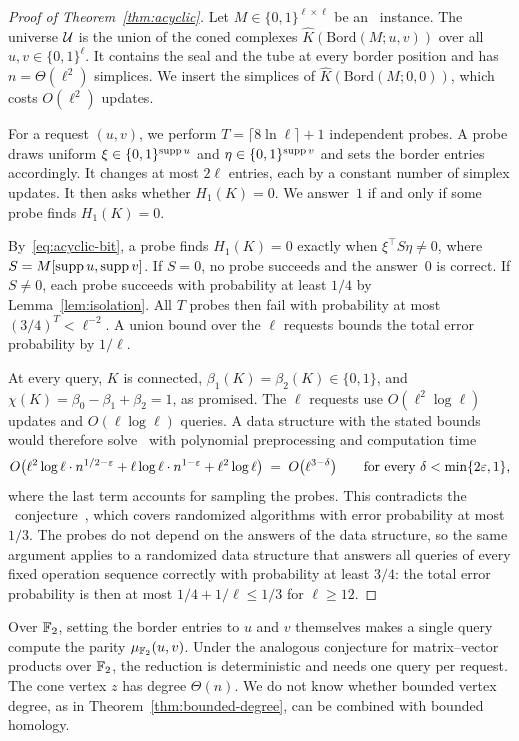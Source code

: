 \begin{proof}[Proof of Theorem~\ref{thm:acyclic}]
Let $M\in\{0,1\}^{\ell\times\ell}$ be an \OuMv\ instance.
The universe $\mathcal{U}$ is the union of the coned complexes $\widehat K(\mathrm{Bord}(M;u,v))$ over all $u,v\in\{0,1\}^{\ell}$.
It contains the seal and the tube at every border position and has $n=\Theta(\ell^2)$ simplices.
We insert the simplices of $\widehat K(\mathrm{Bord}(M;0,0))$, which costs $O(\ell^2)$ updates.

For a request $(u,v)$, we perform $T=\lceil 8\ln\ell\rceil+1$ independent probes.
A probe draws uniform $\xi\in\{0,1\}^{\operatorname{supp} u}$ and $\eta\in\{0,1\}^{\operatorname{supp} v}$ and sets the border entries accordingly.
It changes at most $2\ell$ entries, each by a constant number of simplex updates.
It then asks whether $H_1(K)=0$.
We answer~$1$ if and only if some probe finds $H_1(K)=0$.

By~\eqref{eq:acyclic-bit}, a probe finds $H_1(K)=0$ exactly when $\xi^{\top}S\eta\ne0$, where $S=M[\operatorname{supp} u,\operatorname{supp} v]$.
If $S=0$, no probe succeeds and the answer~$0$ is correct.
If $S\ne0$, each probe succeeds with probability at least $1/4$ by Lemma~\ref{lem:isolation}.
All $T$ probes then fail with probability at most $(3/4)^T<\ell^{-2}$.
A union bound over the $\ell$ requests bounds the total error probability by $1/\ell$.

At every query, $K$ is connected, $\beta_1(K)=\beta_2(K)\in\{0,1\}$, and $\chi(K)=\beta_0-\beta_1+\beta_2=1$, as promised.
The $\ell$ requests use $O(\ell^2\log\ell)$ updates and $O(\ell\log\ell)$ queries.
A data structure with the stated bounds would therefore solve \OuMv\ with polynomial preprocessing and computation time
\[
  O\bigl(\ell^2\log\ell\cdot n^{1/2-\varepsilon}+\ell\log\ell\cdot n^{1-\varepsilon}+\ell^2\log\ell\bigr)
  \;=\;O\bigl(\ell^{3-\delta}\bigr)\qquad\text{for every }\delta<\min\{2\varepsilon,1\},
\]
where the last term accounts for sampling the probes.
This contradicts the \OMv\ conjecture~\cite{HKNS15}, which covers randomized algorithms with error probability at most $1/3$.
The probes do not depend on the answers of the data structure, so the same argument applies to a randomized data structure that answers all queries of every fixed operation sequence correctly with probability at least $3/4$: the total error probability is then at most $1/4+1/\ell\le1/3$ for $\ell\ge12$.
\end{proof}

\begin{remark}
Over $\mathbb{F}_2$, setting the border entries to $u$ and $v$ themselves makes a single query compute the parity $\mu_{\mathbb{F}_2}(u,v)$.
Under the analogous conjecture for matrix--vector products over $\mathbb{F}_2$, the reduction is deterministic and needs one query per request.
The cone vertex $z$ has degree $\Theta(n)$.
We do not know whether bounded vertex degree, as in Theorem~\ref{thm:bounded-degree}, can be combined with bounded homology.
\end{remark}

